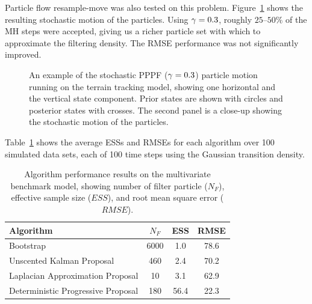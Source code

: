 \documentclass{article}
\begin{document}
Particle flow resample-move was also tested on this problem. Figure~\ref{fig:drone_example_frame_stochastic} shows the resulting stochastic motion of the particles. Using $\gamma=0.3$, roughly $25$--$50\%$ of the MH steps were accepted, giving us a richer particle set with which to approximate the filtering density. The RMSE performance was not significantly improved.
%
\begin{figure}
\centering
{}
\caption{An example of the stochastic PPPF ($\gamma=0.3$) particle motion running on the terrain tracking model, showing one horizontal and the vertical state component. Prior states are shown with circles and posterior states with crosses. The second panel is a close-up showing the stochastic motion of the particles.}
\label{fig:drone_example_frame_stochastic}
\end{figure}

Table~\ref{tab:drone_results_gaussian} shows the average ESSs and RMSEs for each algorithm over 100 simulated data sets, each of 100 time steps using the Gaussian transition density.
%
\begin{table}
\centering
\begin{tabular}{l||c|c|c}
Algorithm                                & $N_F$ & ESS  & RMSE \\
\hline
Bootstrap                                &  6000 &  1.0 & 78.6 \\
Unscented Kalman Proposal                &   460 &  2.4 & 70.2 \\
Laplacian Approximation Proposal         &    10 &  3.1 & 62.9 \\
Deterministic Progressive Proposal       &   180 & 56.4 & 22.3 \\
\end{tabular}
\caption{Algorithm performance results on the multivariate benchmark model, showing number of filter particle ($N_F$), effective sample size ($ESS$), and root mean square error ($RMSE$).}
\label{tab:drone_results_gaussian}
\end{table}
\end{document}
